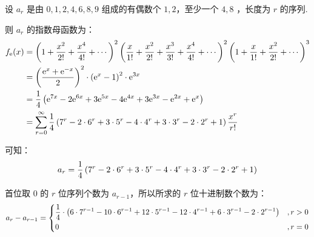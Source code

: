 \documentclass[cn, hazy, blue, normal, 12pt]{elegantnote}
\begin{document}
\begin{solution}[print=true]

    设 $a_r$ 是由 $0, 1, 2, 4, 6, 8, 9$ 组成的有偶数个 $1, 2$，至少一个 $4, 8$ ，长度为 $r$ 的序列.

    则 $a_r$ 的指数母函数为：
    \begin{equation}
        \notag
        \begin{aligned}
            f_{\mathrm{e}}(x)
             & = \left(1+\frac{x^2}{2!}+\frac{x^4}{4!}+\cdots\right)^2
            \left(\frac{x}{1!}+\frac{x^2}{2!}+\frac{x^3}{3!}+\frac{x^4}{4!}+\cdots\right)^2
            \left(1+\frac{x}{1!}+\frac{x^2}{2!}+\cdots\right)^3                \\
             & = \left(\frac{\mathrm{e}^{x}+\mathrm{e}^{-x}}{2}\right)^2 \cdot
            \left(\mathrm{e}^{x}-1\right)^2 \cdot
            \mathrm{e}^{3x}                                                    \\
             & = \frac{1}{4}\left(
            \mathrm{e}^{7x}-2\mathrm{e}^{6x}+3\mathrm{e}^{5x}-4\mathrm{e}^{4x}+
            3\mathrm{e}^{3x}-\mathrm{e}^{2x}+\mathrm{e}^{x}
            \right)                                                            \\
             & =\sum_{r=0}^{\infty}{\frac{1}{4}\left(
            7^r - 2 \cdot 6^r + 3 \cdot 5^r - 4 \cdot 4^r+
            3 \cdot 3^r- 2 \cdot 2^r + 1
            \right)\frac{x^r}{r!}}
        \end{aligned}
    \end{equation}

    可知：
    \begin{equation}
        \notag
        a_r = \frac{1}{4}\left(
        7^r - 2 \cdot 6^r + 3 \cdot 5^r - 4 \cdot 4^r+
        3 \cdot 3^r- 2 \cdot 2^r + 1
        \right)
    \end{equation}

    首位取 $0$ 的 $r$ 位序列个数为 $a_{r-1}$，所以所求的 $r$ 位十进制数个数为：
    \begin{equation}
        \notag
        a_r - a_{r-1} = \left\{
        \begin{aligned}
             & \frac{1}{4} \cdot \left(
            6 \cdot 7^{r-1} - 10 \cdot 6^{r-1} +
            12 \cdot 5^{r-1} - 12 \cdot 4^{r-1} +
            6 \cdot 3^{r-1} - 2 \cdot 2^{r-1}
            \right)
             & , r>0                    \\
             & 0
             & , r=0
        \end{aligned}
        \right.
    \end{equation}

\end{solution}
\end{document}
